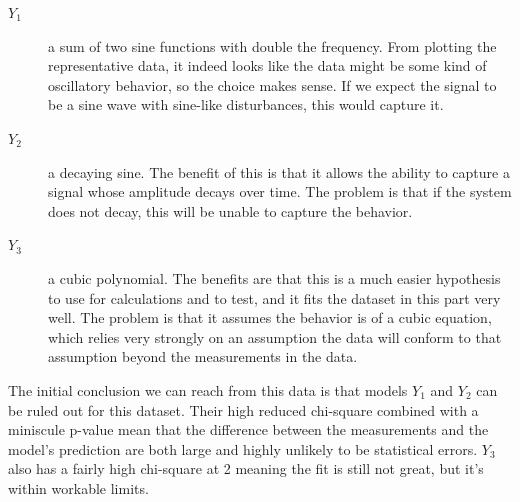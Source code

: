 \begin{description}
    \item[\(Y_1\)] a sum of two sine functions with double the frequency. From plotting the representative data, it indeed looks like the data might be some kind of oscillatory behavior, so the choice makes sense. If we expect the signal to be a sine wave with sine-like disturbances, this would capture it.
    \item[\(Y_2\)] a decaying sine. The benefit of this is that it allows the ability to capture a signal whose amplitude decays over time. The problem is that if the system does not decay, this will be unable to capture the behavior.
    \item[\(Y_3\)] a cubic polynomial. The benefits are that this is a much easier hypothesis to use for calculations and to test, and it fits the dataset in this part very well. The problem is that it assumes the behavior is of a cubic equation, which relies very strongly on an assumption the data will conform to that assumption beyond the measurements in the data.
\end{description}
The initial conclusion we can reach from this data is that models \(Y_1\) and \(Y_2\) can be ruled out for this dataset. Their high reduced chi-square combined with a miniscule p-value mean that the difference between the measurements and the model's prediction are both large and highly unlikely to be statistical errors. \(Y_3\) also has a fairly high chi-square at 2 meaning the fit is still not great, but it's within workable limits.
